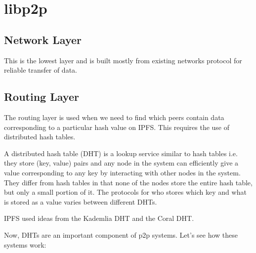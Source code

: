 \section{libp2p}

\subsection{Network Layer}
This is the lowest layer and is built mostly from existing networks protocol for reliable transfer of data. 
\subsection{Routing Layer}
The routing layer is used when we need to find which peers contain data corresponding to a particular hash value on IPFS. This requires the use of distributed hash tables.

A distributed hash table (DHT) is a lookup service similar to hash tables i.e. they store (key, value) pairs and any node in the system can efficiently give a value corresponding to any key by interacting with other nodes in the system. They differ from hash tables in that none of the nodes store the entire hash table, but only a small portion of it. The protocols for who stores which key and what is stored as a value varies between different DHTs.

IPFS used ideas from the Kademlia DHT\cite{Maymounkov:2002:KPI:646334.687801} and the Coral DHT\cite{Freedman:2004:DCP:1251175.1251193}.

Now, DHTs are an important component of p2p systems. Let's see how these systems work:

